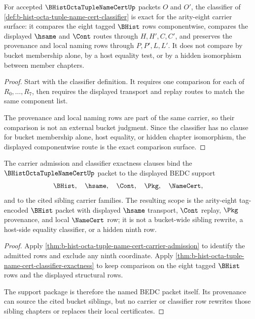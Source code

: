 \begin{theorem}
\label{thm:b-hist-octa-tuple-name-cert-classifier-exactness}
For accepted $\BHistOctaTupleNameCertUp$ packets $O$ and $O'$, the classifier of \autoref{def:b-hist-octa-tuple-name-cert-classifier} is exact for the arity-eight carrier surface: it compares the eight tagged $\BHist$ rows componentwise, compares the displayed $\hsame$ and $\Cont$ routes through $H,H',C,C'$, and preserves the provenance and local naming rows through $P,P',L,L'$. It does not compare by bucket membership alone, by a host equality test, or by a hidden isomorphism between member chapters.
\end{theorem}
\begin{proof}
Start with the classifier definition. It requires one comparison for each of $R_0,\ldots,R_7$, then requires the displayed transport and replay routes to match the same component list.

The provenance and local naming rows are part of the same carrier, so their comparison is not an external bucket judgment. Since the classifier has no clause for bucket membership alone, host equality, or hidden chapter isomorphism, the displayed componentwise route is the exact comparison surface.
\end{proof}

\begin{theorem}
\label{thm:b-hist-octa-tuple-name-cert-scoped-support-package}
The carrier admission and classifier exactness clauses bind the $\BHistOctaTupleNameCertUp$ packet to the displayed BEDC support
$$
\BHist,\quad \hsame,\quad \Cont,\quad \Pkg,\quad \NameCert,
$$
and to the cited sibling carrier families. The resulting scope is the arity-eight tag-encoded $\BHist$ packet with displayed $\hsame$ transport, $\Cont$ replay, $\Pkg$ provenance, and local $\NameCert$ row; it is not a bucket-wide sibling rewrite, a host-side equality classifier, or a hidden ninth row.
\end{theorem}
\begin{proof}
Apply \autoref{thm:b-hist-octa-tuple-name-cert-carrier-admission} to identify the admitted rows and exclude any ninth coordinate. Apply \autoref{thm:b-hist-octa-tuple-name-cert-classifier-exactness} to keep comparison on the eight tagged $\BHist$ rows and the displayed structural rows.

The support package is therefore the named BEDC packet itself. Its provenance can source the cited bucket siblings, but no carrier or classifier row rewrites those sibling chapters or replaces their local certificates.
\end{proof}

